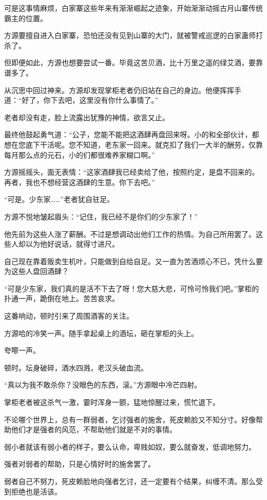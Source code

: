 \begin{this_body}
可是这事情麻烦，白家寨这些年来有渐渐崛起之迹象，开始渐渐动摇古月山寨传统霸主的位置。

方源要擅自进入白家寨，恐怕还没有见到山寨的大门，就被警戒巡逻的白家蛊师打杀了。

但即便如此，方源也想要尝试一番。毕竟这苦贝酒，比十万里之遥的绿艾酒，要靠谱多了。

从沉思中回过神来。方源却发现掌柜老者仍旧站在自己的身边。他便挥挥手道：“好了，你下去吧，这里没有你什么事情了。”

老者却没有走，脸上流露出犹豫的神情，欲言又止。

最终他鼓起勇气道：“公子，您能不能把这酒肆再盘回来呀。小的和全部伙计，都想在您底下干活呢。您不知道，老东家一回来。就克扣了我们一大半的酬劳，仅靠每月那么点的元石，小的们都很难养家糊口啊。”

方源摇摇头，面无表情：“这家酒肆我已经卖给了他，按照约定，是盘不回来的。再者，我也不想经营这酒肆的生意。你下去吧。”

“可是。少东家……”老者犹自驻足。

方源不悦地皱起眉头：“记住，我已经不是你们的少东家了！”

他先前为这些人涨了薪酬。不过是想调动出他们工作的热情。为自己所用罢了。这些人却以为他好说话，就得寸进尺。

自己现在靠着贩卖生机叶，只能做到自给自足。又一直为苦酒烦心不已，凭什么要为这些人盘回酒肆？

“可是少东家，我们真的是活不下去了呀！您大慈大悲，可怜可怜我们吧。”掌柜的扑通一声，跪倒在地上。苦苦哀求。

这番响动，顿时引来了周围酒客的关注。

方源哈的冷笑一声。随手拿起桌上的酒坛，砸在掌柜的头上。

夸嚓一声。

顿时。坛身破碎，酒水四溅，老汉头破血流。

“真以为我不敢杀你？没眼色的东西，滚。”方源眼中冷芒四射。

掌柜老者被这杀气一激，霎时浑身一颤，猛地惊醒过来，慌忙退下。

不论哪个世界上，总有一群弱者，乞讨强者的施舍，死皮赖脸又不知分寸。好像帮助他们才是强者的风范，不帮助他们就是不对的事情。

弱小者就该有弱小者的样子，要么认命，卑贱如奴，要么就奋发，低调地努力。

强者对弱者的帮助，只是心情好时的施舍罢了。

弱者自己不努力，死皮赖脸地向强者乞讨，还一定要有个结果，纠缠不清。那么受到拒绝也是活该。


\end{this_body}
